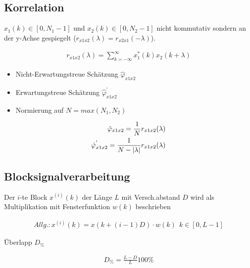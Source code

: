 \documentclass[10pt,a4paper]{article}
\begin{document}
  \subsection{Korrelation}
  $x_1(k) \in [0,N_1-1]$ und $x_2(k) \in [0,N_2-1]$ nicht kommutativ sondern an der y-Achse gespiegelt ($r_{x1x2}(\lambda)=r_{x2x1}(-\lambda)$).
  \begin{mdframed}[style=exercise]
    \begin{align}
        r_{x1x2}(\lambda) = \sum_{k=-\infty}^{\infty}x_1^*(k) x_2(k+\lambda)
    \end{align}
  \end{mdframed}
\begin{itemize}
    \item Nicht-Erwartungstreue Schätzung $\hat{\varphi}_{x1x2}$
    \item Erwartungstreue Schätzung $\hat{\varphi}_{x1x2}^{'}$
    \item Normierung auf $N = max(N_1,N_2)$
\end{itemize}
  \begin{mdframed}[style=exercise]
    \begin{align}
        \hat{\varphi}_{x1x2} = \frac{1}{N} r_{x1x2}(\lambda)\\
        \hat{\varphi}_{x1x2}^{'} = \frac{1}{N-\abs{\lambda}} r_{x1x2}(\lambda)
    \end{align}
  \end{mdframed}
  \subsection{Blocksignalverarbeitung}
  Der $i$-te Block $x^{(i)}(k)$ der Länge $L$ mit Versch.abstand $D$ 
  wird als Multiplikation mit Fensterfunktion $w(k)$ beschrieben
  \begin{mdframed}[style=exercise]
    \begin{align}
        Allg.:
        x^{(i)}(k) = x(k+(i-1)D) \cdot w(k)\ \ k\in[0,L-1] 
    \end{align}
  \end{mdframed}
  Überlapp $D_\%$
  \begin{mdframed}[style=exercise]
    \begin{align}
        D_\% = \frac{L-D}{L}100\%
    \end{align}
  \end{mdframed}
\end{document}
